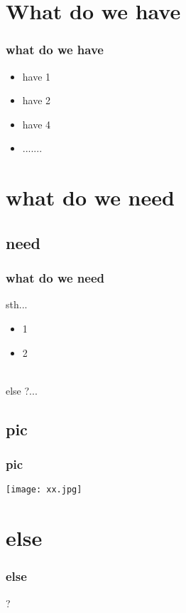 \documentclass{beamer}
\begin{document}
\section{What do we have}
 
\begin{frame}
	\frametitle{what do we have}
	\begin{itemize}[<+-|alert@+>]
		\item have 1
		\item have 2
		\item have 4
		\item .......
	\end{itemize}
\end{frame}
 
\section{what do we need}
\subsection{need}
\begin{frame}
	\frametitle{what do we need}
	sth...
	\begin{itemize}[<+-|alert@+>]
		\item 1
		\item 2
	\end{itemize} 
	\hfill \\
	else ?...
\end{frame}
 
\subsection{pic}
\begin{frame}
	\frametitle{pic}
	\centerline{\texttt{[image: xx.jpg]}}\label{phb}
\end{frame}
 
\section{else}
\begin{frame}
    \frametitle{else}
	\begin{center}\Huge{?}\end{center}
\end{frame}
\end{document}
